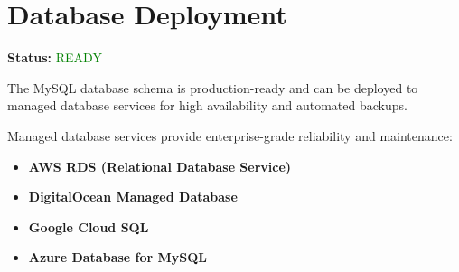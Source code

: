 

\section{Database Deployment}

\textbf{Status:} \textcolor{green}{READY}

The MySQL database schema is production-ready and can be deployed to managed database services for high availability and automated backups.


Managed database services provide enterprise-grade reliability and maintenance:

\begin{itemize}
    \item \textbf{AWS RDS (Relational Database Service)}%
    
    \item \textbf{DigitalOcean Managed Database}%
    
    \item \textbf{Google Cloud SQL}%
    
    \item \textbf{Azure Database for MySQL}%
\end{itemize}

